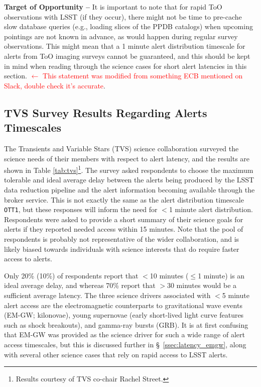 \documentclass[DM,lsstdraft,authoryear,toc]{lsstdoc}
\begin{document}
{\bf Target of Opportunity --} It is important to note that for rapid ToO observations with LSST (if they occur), there might not be time to pre-cache slow database queries (e.g., loading slices of the PPDB catalogs) when upcoming pointings are not known in advance, as would happen during regular survey observations. This might mean that a 1 minute alert distribution timescale for alerts from ToO imaging surveys cannot be guaranteed, and this should be kept in mind when reading through the science cases for short alert latencies in this section. \textcolor{red}{$\leftarrow$ This statement was modified from something ECB mentioned on Slack, double check it's accurate}.

\subsection{TVS Survey Results Regarding Alerts Timescales}\label{ssec:latency_tvs}

The Transients and Variable Stars (TVS) science collaboration surveyed the science needs of their members with respect to alert latency, and the results are shown in Table \ref{tab:tvs}\footnote{Results courtesy of TVS co-chair Rachel Street.}. The survey asked respondents to choose the maximum tolerable and ideal average delay between the alerts being produced by the LSST data reduction pipeline and the alert information becoming available through the broker service. This is not exactly the same as the alert distribution timescale {\tt OTT1}, but these responses will inform the need for $<$1 minute alert distribution.  Respondents were asked to provide a short summary of their science goals for alerts if they reported needed access within 15 minutes. Note that the pool of respondents is probably not representative of the wider collaboration, and is likely biased towards individuals with science interests that do require faster access to alerts. 

Only 20\% (10\%) of respondents report that $<$10 minutes ($\leq$1 minute) is an ideal average delay, and whereas 70\% report that $>$30 minutes would be a sufficient average latency. The three science drivers associated with $<$5 minute alert access are the electromagnetic counterparts to gravitational wave events (EM-GW; kilonovae), young supernovae (early short-lived light curve features such as shock breakouts), and gamma-ray bursts (GRB). It is at first confusing that EM-GW was provided as the science driver for such a wide range of alert access timescales, but this is discussed further in \S~\ref{ssec:latency_emgw}, along with several other science cases that rely on rapid access to LSST alerts.
\end{document}
